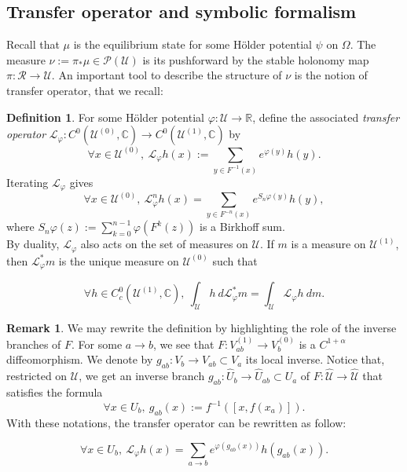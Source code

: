 \documentclass[a4paper]{article}
\theoremstyle{definition}
\newtheorem{definition}{Definition}[section]
\newtheorem{remark}[example]{Remark}
\begin{document}
\subsection{Transfer operator and symbolic formalism}

Recall that $\mu$ is the equilibrium state for some Hölder potential $\psi$ on $\Omega$. The measure $\nu := \pi_* \mu \in \mathcal{P}(\mathcal{U})$ is its pushforward by the stable holonomy map $\pi:\mathcal{R} \rightarrow \mathcal{U}$. An important tool to describe the structure of $\nu$ is the notion of transfer operator, that we recall:

\begin{definition}
For some Hölder potential $\varphi:\mathcal{U} \rightarrow \mathbb{R}$, define the associated \emph{transfer operator} $ \mathcal{L}_\varphi : C^0( \mathcal{U}^{(0)} ,\mathbb{C}) \longrightarrow  C^0( \mathcal{U}^{(1)} ,\mathbb{C}) $
by 
$$ \forall x \in \mathcal{U}^{(0)}, \  \mathcal{L}_\varphi h (x) := \sum_{y \in F^{-1}(x)} e^{\varphi(y)} h(y) .$$
Iterating $\mathcal{L}_\varphi$ gives
$$ \forall x \in \mathcal{U}^{(0)}, \ \mathcal{L}_\varphi^n h (x) = \sum_{y \in F^{-n}(x)} e^{S_n \varphi(y)} h(y) ,$$
where $S_n \varphi(z) := \sum_{k=0}^{n-1} \varphi(F^k(z))$ is a Birkhoff sum. \\

By duality, $\mathcal{L}_\varphi$ also acts on the set of measures on $\mathcal{U}$. If $m$ is a measure on $\mathcal{U}^{(1)}$, then $\mathcal{L}_\varphi^* m$ is the unique measure on $\mathcal{U}^{(0)}$ such that

$$ \forall h \in C^0_c( \mathcal{U}^{(1)}, \mathbb{C}), \ \int_{\mathcal{U}} h \ d \mathcal{L}_\varphi^* m = \int_{\mathcal{U}} \mathcal{L}_\varphi h \ dm  .$$

\end{definition}

\begin{remark}
We may rewrite the definition by highlighting the role of the inverse branches of $F$.
For some $a \rightarrow b$, we see that $F : V_{ab}^{(1)} \rightarrow V_{b}^{(0)}$ is a $C^{1+\alpha}$ diffeomorphism. We denote by $g_{ab} : V_b \rightarrow V_ {ab} \subset V_a$ its local inverse. Notice that, restricted on $\mathcal{U}$, we get an inverse branch $g_{ab} : \widehat{U}_{b} \rightarrow \widehat{U}_{ab} \subset U_a$ of $F : \widehat{\mathcal{U}} \rightarrow \widehat{\mathcal{U}}$ that satisfies the formula
$$ \forall x \in U_b, \ g_{ab}(x) := f^{-1}([ x , f(x_a) ]) .$$
With these notations, the transfer operator can be rewritten as follow:

$$ \forall x \in U_b, \ \mathcal{L}_\varphi h(x) = \sum_{a \rightarrow b} e^{\varphi(g_{ab}(x))} h(g_{ab}(x)) .$$
\end{remark}
\end{document}
